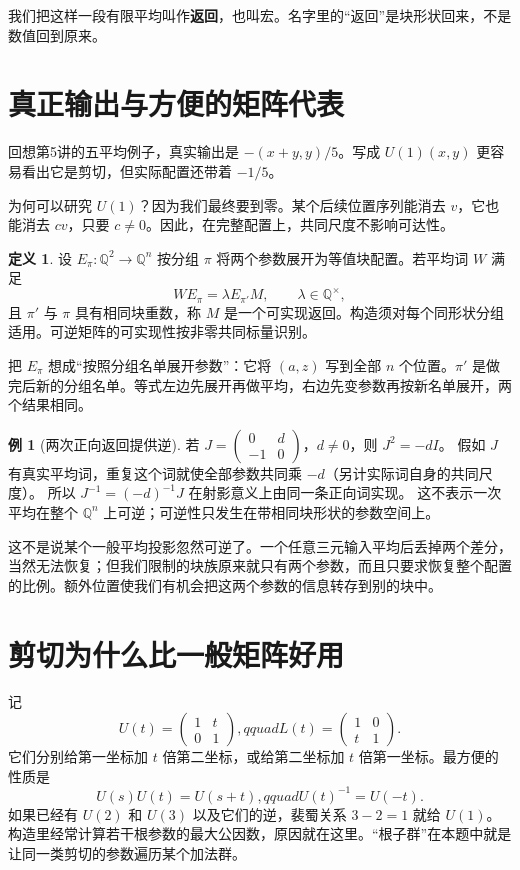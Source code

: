 \documentclass[11pt,a4paper,oneside,openany]{book}
\newcommand{\Q}{\mathbb Q}
\theoremstyle{definition}
\newtheorem{definition}[theorem]{定义}
\newtheorem{example}[theorem]{例}
\numberwithin{equation}{chapter}
\begin{document}
我们把这样一段有限平均叫作\textbf{返回}，也叫宏。名字里的“返回”是块形状回来，不是数值回到原来。

\section{真正输出与方便的矩阵代表}
回想第5讲的五平均例子，真实输出是 $-(x+y,y)/5$。写成 $U(1)(x,y)$ 更容易看出它是剪切，但实际配置还带着 $-1/5$。

为何可以研究 $U(1)$？因为我们最终要到零。某个后续位置序列能消去 $v$，它也能消去 $cv$，只要 $c\ne0$。因此，在完整配置上，共同尺度不影响可达性。
\begin{definition}\label{def:return}
设 $E_\pi:\Q^2\to\Q^n$ 按分组 $\pi$ 将两个参数展开为等值块配置。若平均词 $W$ 满足
\begin{equation}\label{eq:return}
WE_\pi=\lambda E_{\pi'}M,\qquad \lambda\in\Q^\times,
\end{equation}
且 $\pi'$ 与 $\pi$ 具有相同块重数，称 $M$ 是一个可实现返回。构造须对每个同形状分组适用。可逆矩阵的可实现性按非零共同标量识别。
\end{definition}
把 $E_\pi$ 想成“按照分组名单展开参数”：它将 $(a,z)$ 写到全部 $n$ 个位置。$\pi'$ 是做完后新的分组名单。等式左边先展开再做平均，右边先变参数再按新名单展开，两个结果相同。

\begin{example}[两次正向返回提供逆]
若 $J=\left(\begin{smallmatrix}0&d\\-1&0\end{smallmatrix}\right)$，$d\ne0$，则 $J^2=-dI$。
假如 $J$ 有真实平均词，重复这个词就使全部参数共同乘 $-d$（另计实际词自身的共同尺度）。
所以 $J^{-1}=(-d)^{-1}J$ 在射影意义上由同一条正向词实现。
这不表示一次平均在整个 $\Q^n$ 上可逆；可逆性只发生在带相同块形状的参数空间上。
\end{example}
这不是说某个一般平均投影忽然可逆了。一个任意三元输入平均后丢掉两个差分，当然无法恢复；但我们限制的块族原来就只有两个参数，而且只要求恢复整个配置的比例。额外位置使我们有机会把这两个参数的信息转存到别的块中。

\section{剪切为什么比一般矩阵好用}
记
\[U(t)=\begin{pmatrix}1&t\\0&1\end{pmatrix},qquad
L(t)=\begin{pmatrix}1&0\\t&1\end{pmatrix}.
\]
它们分别给第一坐标加 $t$ 倍第二坐标，或给第二坐标加 $t$ 倍第一坐标。最方便的性质是
\[U(s)U(t)=U(s+t),qquad U(t)^{-1}=U(-t).
\]
如果已经有 $U(2)$ 和 $U(3)$ 以及它们的逆，裴蜀关系 $3-2=1$ 就给 $U(1)$。构造里经常计算若干根参数的最大公因数，原因就在这里。“根子群”在本题中就是让同一类剪切的参数遍历某个加法群。
\end{document}
